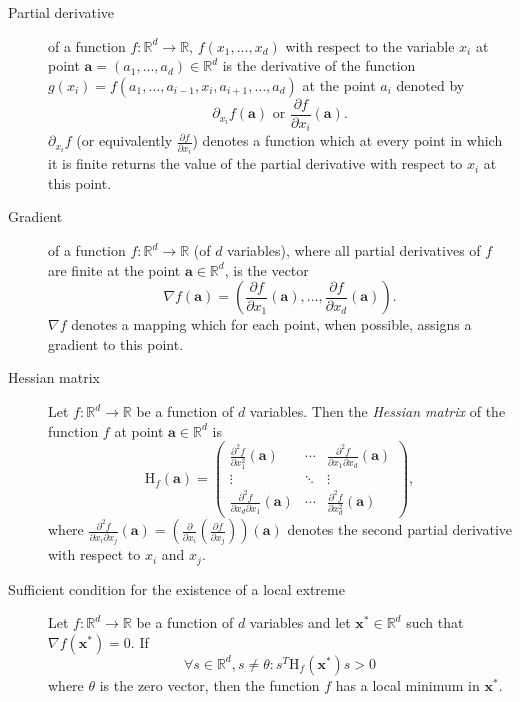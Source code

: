 \documentclass[a4paper]{article}
\begin{document}
	\begin{description}
		\item[Partial derivative] of a function $f: \mathbb{R}^d \to \mathbb{R}$,
			$f(x_1, \ldots, x_d)$ with respect to the variable $x_i$ at point
			$\boldsymbol{a} = (a_1, \ldots, a_d) \in \mathbb{R}^d$ is the derivative of
			the function $g(x_i) = f(a_1, \ldots, a_{i - 1}, x_i, a_{i + 1}, \ldots, a_d)$
			at the point $a_i$ denoted by \[
				\partial_{x_i} f(\boldsymbol{a})
				\text{ or }
				\frac{\partial f}{\partial x_i} \left( \boldsymbol{a} \right)
			.\] $\partial_{x_i} f$ (or equivalently $\frac{\partial f}{\partial x_i}$)
			denotes a function which at every point in which it is finite
			returns the value of the partial derivative with respect to $x_i$ 
			at this point.
		\item[Gradient] of a function $f: \mathbb{R}^d \to \mathbb{R}$ (of $d$ variables),
			where all partial derivatives of $f$ are finite at the point
			$\boldsymbol{a} \in \mathbb{R}^d$, is the vector \[
				\nabla f(\boldsymbol{a})
				  = \left(
				  \frac{\partial f}{\partial x_1}(\boldsymbol{a}),
				  \ldots,
				  \frac{\partial f}{\partial x_d}(\boldsymbol{a})
				  \right)
			.\] $\nabla f$ denotes a mapping which for each point, when possible,
			assigns a gradient to this point.

		\item[Hessian matrix] Let $f: \mathbb{R}^d \to \mathbb{R}$ be a function of $d$
			variables. Then the \textit{Hessian matrix} of the function $f$
			at point $\boldsymbol{a} \in \mathbb{R}^d$ is \[
			\boldsymbol{\mathrm{H}}_f(\boldsymbol{a}) =
			\begin{pmatrix}
				\frac{\partial^2 f}{\partial x_1^2}(\boldsymbol{a})
					& \cdots
					& \frac{\partial^2 f}{\partial x_1 \partial x_d}(\boldsymbol{a}) \\
				\vdots
					& \ddots
					& \vdots \\
				\frac{\partial^2 f}{\partial x_d \partial x_1}(\boldsymbol{a})
					& \cdots
					& \frac{\partial^2 f}{\partial x_d^2}(\boldsymbol{a})
			\end{pmatrix}
			,\] where $\frac{\partial^2 f}{\partial x_i \partial x_j}(\boldsymbol{a}) =
			\left( \frac{\partial}{\partial x_i}( \frac{\partial f}{\partial x_j} ) \right)(\boldsymbol{a})$
			denotes the second partial derivative with respect to $x_i$ and $x_j$.
		\item[Sufficient condition for the existence of a local extreme]
			Let \mbox{$f: \mathbb{R}^d \to \mathbb{R}$} be a function of $d$ variables and
			let $\boldsymbol{x}^* \in \mathbb{R}^d$ such that $\nabla f(\boldsymbol{x}^*) = 0$.
			If \[
				\forall s \in \mathbb{R}^d, s \neq \theta:
				s^T \boldsymbol{\mathrm{H}}_f(\boldsymbol{x}^*) s > 0
			\] where $\theta$ is the zero vector, then the function $f$ has a
			local minimum in $\boldsymbol{x}^*$.
	\end{description}
\end{document}
